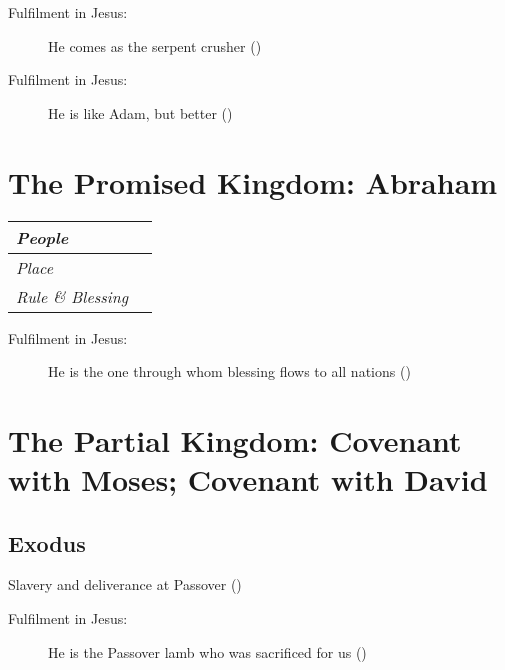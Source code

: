 \documentclass{mycworkshop}
\begin{document}
\begin{description}
  \item[Fulfilment in Jesus:] He comes as the serpent crusher
    ()
\end{description}

\smallskip

\begin{description}
  \item[Fulfilment in Jesus:] He is like Adam, but better ()
\end{description}

\section{The Promised Kingdom: Abraham}


\begin{tabularx}{\linewidth}{|>{\itshape}l|X|}
  \hline
  People & \\[10.8bp]
  \hline
  Place & \\[10.8bp]
  \hline
  Rule \& Blessing & \\[10.8bp]
  \hline
\end{tabularx}

\begin{description}
  \item[Fulfilment in Jesus:] He is the one through whom blessing flows to all
    nations ()
\end{description}

\section{The Partial Kingdom: Covenant with Moses; Covenant with David}

\subsection{Exodus}

\begin{indentblock}
  Slavery and deliverance at Passover ()

  \vfill

  \begin{description}
    \item[Fulfilment in Jesus:] He is the Passover lamb who was sacrificed for
      us ()
  \end{description}
\end{indentblock}
\end{document}
